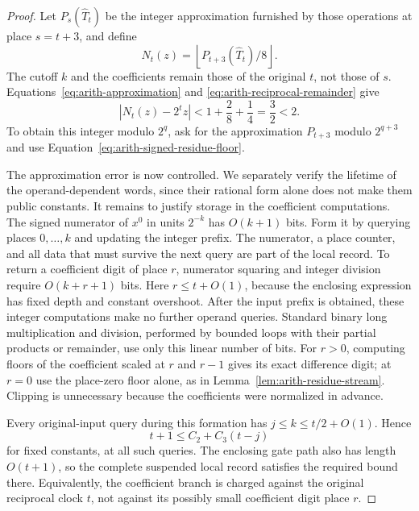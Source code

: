 \begin{proof}
Let $P_s(\widehat T_t)$ be the integer approximation furnished by
those operations at place $s=t+3$, and define
\begin{equation}
 N_t(z)=\left\lfloor P_{t+3}(\widehat T_t)/8\right\rfloor.
 \label{eq:arith-reciprocal-approximation}
\end{equation}
The cutoff $k$ and the coefficients remain those of the original $t$,
not those of $s$.  Equations~\eqref{eq:arith-approximation} and
\eqref{eq:arith-reciprocal-remainder} give
\[
 |N_t(z)-2^tz|<1+\frac28+\frac14=\frac32<2.
\]
To obtain this integer modulo $2^q$, ask for the approximation
$P_{t+3}$ modulo $2^{q+3}$ and use
Equation~\eqref{eq:arith-signed-residue-floor}.

The approximation error is now controlled. We separately verify the lifetime of the operand-dependent words, since their rational form alone does not make them public constants. It remains to justify storage in the coefficient computations.
The signed numerator of $x^0$ in units $2^{-k}$ has $O(k+1)$
bits.  Form it by querying places $0,\ldots,k$ and updating the
integer prefix.  The numerator, a place counter, and all data that
must survive the next query are part of the local record.
To return a coefficient digit of place $r$, numerator squaring and
integer division require $O(k+r+1)$ bits.  Here $r\leq t+O(1)$,
because the enclosing expression has fixed depth and constant
overshoot.  After the input prefix is obtained, these integer
computations make no further operand queries.  Standard binary
long multiplication and division, performed by bounded loops with
their partial products or remainder, use only this linear number
of bits.  For $r>0$, computing floors of the coefficient scaled at
$r$ and $r-1$ gives its exact difference digit; at $r=0$ use the
place-zero floor alone, as in Lemma~\ref{lem:arith-residue-stream}.
Clipping is unnecessary
because the coefficients were normalized in advance.

Every original-input query during this formation has
$j\leq k\leq t/2+O(1)$.  Hence
\begin{equation}
 t+1\leq C_2+C_3(t-j)
 \label{eq:arith-early-word-payment}
\end{equation}
for fixed constants, at all such queries.  The enclosing gate path
also has length $O(t+1)$, so the complete suspended local record
satisfies the required bound there.  Equivalently, the coefficient
branch is charged against the original reciprocal clock $t$, not
against its possibly small coefficient digit place $r$.


\end{proof}
